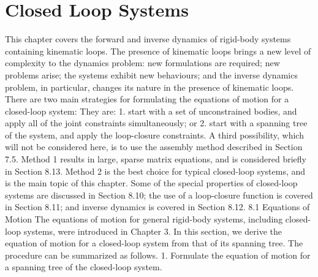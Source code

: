 \chapter{Closed Loop Systems}
\label{chap:8}
This chapter covers the forward and inverse dynamics of rigid-body systems containing kinematic loops. The presence of kinematic loops brings a new level of complexity to the dynamics problem: new formulations are required; new problems arise; the systems exhibit new behaviours; and the inverse dynamics problem, in particular, changes its nature in the presence of kinematic loops. There are two main strategies for formulating the equations of motion for a closed-loop system: They are: 1. start with a set of unconstrained bodies, and apply all of the joint constraints simultaneously; or 2. start with a spanning tree of the system, and apply the loop-closure constraints. A third possibility, which will not be considered here, is to use the assembly method described in Section 7.5. Method 1 results in large, sparse matrix equations, and is considered briefly in Section 8.13. Method 2 is the best choice for typical closed-loop systems, and is the main topic of this chapter. Some of the special properties of closed-loop systems are discussed in Section 8.10; the use of a loop-closure function is covered in Section 8.11; and inverse dynamics is covered in Section 8.12. 8.1 Equations of Motion The equations of motion for general rigid-body systems, including closed-loop systems, were introduced in Chapter 3. In this section, we derive the equation of motion for a closed-loop system from that of its spanning tree. The procedure can be summarized as follows. 1. Formulate the equation of motion for a spanning tree of the closed-loop system.

